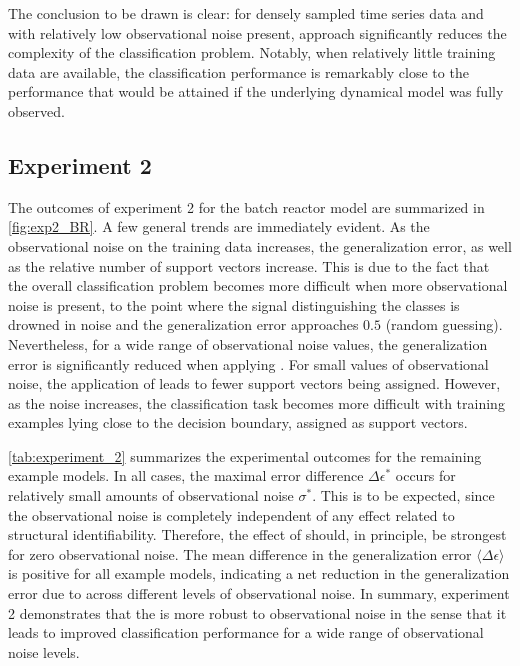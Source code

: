 The conclusion to be drawn is clear: for densely sampled time series data and with relatively low observational noise present, \myMethod{} approach significantly reduces the complexity of the classification problem.
Notably, when relatively little training data are available, the classification performance is remarkably close to the performance that would be attained if the underlying dynamical model was fully observed.

\subsection{Experiment 2}
The outcomes of experiment 2 for the batch reactor model are summarized in \autoref{fig:exp2_BR}.
A few general trends are immediately evident.
As the observational noise on the training data increases, the generalization error, as well as the relative number of support vectors increase.
This is due to the fact that the overall classification problem becomes more difficult when more observational noise is present, to the point where the signal distinguishing the classes is drowned in noise and the generalization error approaches $0.5$ (random guessing).
Nevertheless, for a wide range of observational noise values, the generalization error is significantly reduced when applying \myMethod{}.
For small values of observational noise, the application of \myMethod{} leads to fewer support vectors being assigned.
However, as the noise increases, the classification task becomes more difficult with  training examples lying close to the decision boundary,  assigned as support vectors.

\autoref{tab:experiment_2} summarizes the experimental outcomes for the remaining example models.
In all cases, the maximal error difference $\Delta \epsilon^{\ast}$ occurs for relatively small amounts of observational noise $\sigma^{\ast}$.
This is to be expected, since the observational noise is completely independent of any effect related to structural identifiability.
Therefore, the effect of \myMethod{} should, in principle, be strongest for zero observational noise.
The mean difference in the generalization error $\langle \Delta \epsilon \rangle$ is positive for all example models, indicating a net reduction in the generalization error due to \myMethod{} across different levels of observational noise.
In summary, experiment 2 demonstrates that the  \myMethod{} is more robust to observational noise in the sense that it leads to improved classification performance for a wide range of observational noise levels.

